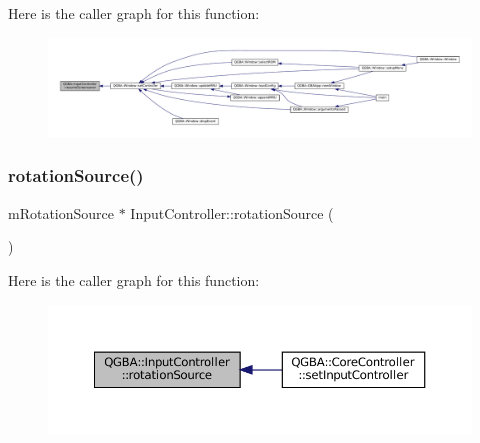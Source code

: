 Here is the caller graph for this function\+:
\nopagebreak
\begin{figure}[H]
\begin{center}
\leavevmode
\includegraphics[width=350pt]{class_q_g_b_a_1_1_input_controller_afc0f0a7619fca7bb6a7afa073c7fb19a_icgraph}
\end{center}
\end{figure}
\mbox{\label{class_q_g_b_a_1_1_input_controller_add8a230375dbbc40f02ed514962f5afd}} 
\subsubsection{\texorpdfstring{rotation\+Source()}{rotationSource()}}
{\footnotesize\ttfamily m\+Rotation\+Source $\ast$ Input\+Controller\+::rotation\+Source (\begin{DoxyParamCaption}{ }\end{DoxyParamCaption})}

Here is the caller graph for this function\+:
\nopagebreak
\begin{figure}[H]
\begin{center}
\leavevmode
\includegraphics[width=350pt]{class_q_g_b_a_1_1_input_controller_add8a230375dbbc40f02ed514962f5afd_icgraph}
\end{center}
\end{figure}
\mbox{\label{class_q_g_b_a_1_1_input_controller_a178e6dee0c72e0aa7fc5c10d48541703}} 
